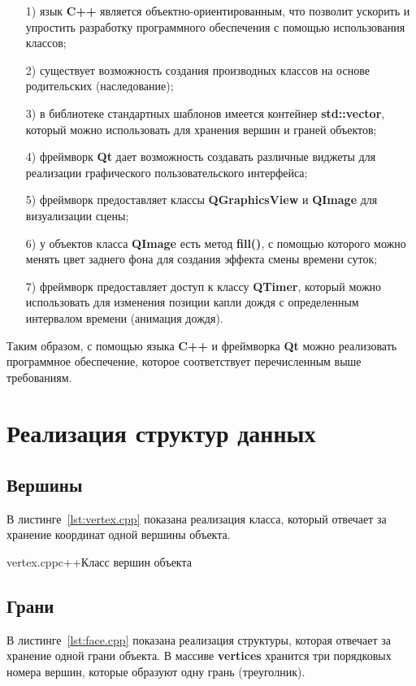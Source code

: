 \begin{enumerate}
\item[1)]
язык \textbf{C++} является объектно-ориентированным, что позволит ускорить и упростить разработку программного обеспечения с помощью использования классов;
\item[2)]
существует возможность создания производных классов на основе родительских (наследование);
\item[3)]
в библиотеке стандартных шаблонов имеется контейнер \textbf{std::vector}, который можно использовать для хранения вершин и граней объектов;
\item[4)]
фреймворк \textbf{Qt} дает возможность создавать различные виджеты для реализации графического пользовательского интерфейса;
\item[5)]
фреймворк предоставляет классы \textbf{QGraphicsView} и \textbf{QImage} для визуализации сцены;
\item[6)]
у объектов класса \textbf{QImage} есть метод \textbf{fill()}, с помощью которого можно менять цвет заднего фона для создания эффекта смены времени суток;
\item[7)]
фреймворк предоставляет доступ к классу \textbf{QTimer}, который можно использовать для изменения позиции капли дождя с определенным интервалом времени (анимация дождя).
\end{enumerate}

Таким образом, с помощью языка \textbf{C++} и фреймворка \textbf{Qt} можно реализовать программное обеспечение, которое соответствует перечисленным выше требованиям.

\section{Реализация структур данных}

\subsection{Вершины}

В листинге~\ref{lst:vertex.cpp} показана реализация класса, который отвечает за хранение координат одной вершины объекта.

{vertex.cpp}{c++}{Класс вершин объекта}

\subsection{Грани}

В листинге~\ref{lst:face.cpp} показана реализация структуры, которая отвечает за хранение одной грани объекта. 
В массиве \textbf{vertices} хранится три порядковых номера вершин, которые образуют одну грань (треуголник).

